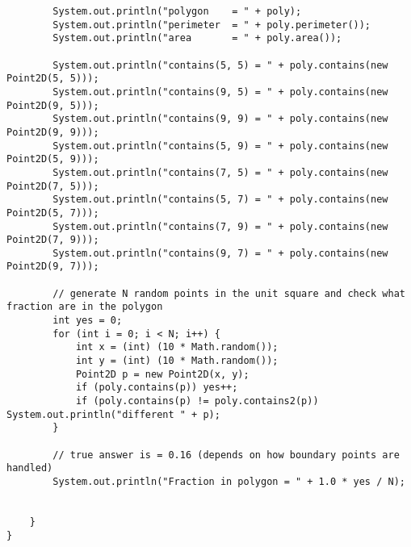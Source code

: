 \begin{verbatim}
        System.out.println("polygon    = " + poly);
        System.out.println("perimeter  = " + poly.perimeter());
        System.out.println("area       = " + poly.area());

        System.out.println("contains(5, 5) = " + poly.contains(new Point2D(5, 5)));
        System.out.println("contains(9, 5) = " + poly.contains(new Point2D(9, 5)));
        System.out.println("contains(9, 9) = " + poly.contains(new Point2D(9, 9)));
        System.out.println("contains(5, 9) = " + poly.contains(new Point2D(5, 9)));
        System.out.println("contains(7, 5) = " + poly.contains(new Point2D(7, 5)));
        System.out.println("contains(5, 7) = " + poly.contains(new Point2D(5, 7)));
        System.out.println("contains(7, 9) = " + poly.contains(new Point2D(7, 9)));
        System.out.println("contains(9, 7) = " + poly.contains(new Point2D(9, 7)));

        // generate N random points in the unit square and check what fraction are in the polygon
        int yes = 0;
        for (int i = 0; i < N; i++) {
            int x = (int) (10 * Math.random());
            int y = (int) (10 * Math.random());
            Point2D p = new Point2D(x, y);
            if (poly.contains(p)) yes++;
            if (poly.contains(p) != poly.contains2(p)) System.out.println("different " + p);
        }

        // true answer is = 0.16 (depends on how boundary points are handled)
        System.out.println("Fraction in polygon = " + 1.0 * yes / N);


    }
}
\end{verbatim}
